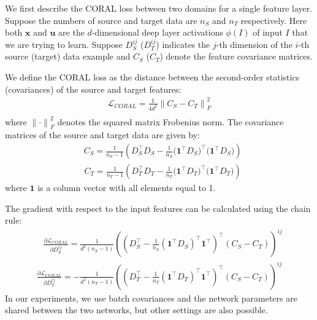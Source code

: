 \documentclass[graybox]{svmult}
\newcommand{\xSrc}{\vec{x}}
\newcommand{\xTar}{\vec{u}}
\renewcommand\vec[1]{\mathbf{#1}}
\begin{document}
We first describe the CORAL loss between two domains for a single feature layer. Suppose the numbers of source and target data are $n_{S}$ and $n_{T}$ respectively. Here both $\xSrc$ and $\xTar$ are the $d$-dimensional deep layer activations $\phi(I)$ of input $I$ that we are trying to learn. Suppose $D_S^{ij}$ ($D_T^{ij}$) indicates the $j$-th dimension of the $i$-th source (target) data example and $C_{S}$ ($C_{T}$) denote the feature covariance matrices. 

We define the CORAL loss as the distance between the second-order statistics (covariances) of the source and target features:
      \begin{equation}
      \begin{aligned}
      {\mathcal{L}_{CORAL}}= {\frac{1}{4d^2}}{\| C_{S} - C_{T} \|}^2_F\\
      \end{aligned}
      \label{eq:coral}
      \end{equation}
where ${\|\cdot\|}^2_F$ denotes the squared matrix Frobenius norm. 
The covariance matrices of the source and target data are given by:
      \begin{equation}
      \begin{aligned}
      &C_{S}= {\frac{1}{n_{S}-1}}({D_S^{\top} D_S - \frac{1}{n_{S}}{({\textbf{1}}^{\top}D_S})^{\top}{({\textbf{1}}^{\top}D_S})})
      \end{aligned}
      \label{eq:cov_s}
      \end{equation}
      \begin{equation}
      \begin{aligned}
      &C_{T}= {\frac{1}{n_{T}-1}}({D_T^{\top} D_T - \frac{1}{n_{T}}{({\textbf{1}}^{\top}D_T})^{\top}{({\textbf{1}}^{\top}D_T})})
      \end{aligned}
      \label{eq:cov_t}
      \end{equation}
where $\textbf{1}$ is a column vector with all elements equal to 1. 

The gradient with respect to the input features can be calculated using the chain rule:
      \begin{equation}
      \begin{aligned}
      &\frac{\partial{\mathcal{L}_{CORAL}}}{\partial{D_S^{ij}}}=\frac{1}{d^2(n_S-1)}((D_S^{\top}-\frac{1}{n_{S}}({{\textbf{1}}^{\top}D_S})^{\top}{\textbf{1}}^{\top})^{\top}(C_{S} - C_{T}))^{ij}
      \end{aligned}
      \label{eq:gradient_s}
      \end{equation}
      \begin{equation}
      \begin{aligned}
      \frac{\partial{\mathcal{L}_{CORAL}}}{\partial{D_T^{ij}}}=-\frac{1}{d^2(n_T-1)}((D_T^{\top}-\frac{1}{n_{T}}({{\textbf{1}}^{\top}D_T})^{\top}{\textbf{1}}^{\top})^{\top}(C_{S} - C_{T}))^{ij}
      \end{aligned}
      \label{eq:gradient_t}
      \end{equation}
In our experiments, we use batch covariances and the network parameters are shared between the two networks, but other settings are also possible.
\end{document}
